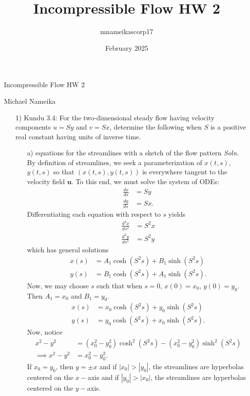 \documentclass{article}
\title{Incompressible Flow HW 2}
\author{mnameikascorp17 }
\date{February 2025}
\begin{document}
\begin{center}
    {\huge Incompressible Flow HW 2}
    \vspace{0.5cm}

    {\large Michael Nameika}
\end{center}

\begin{itemize}
    \item[1)] Kundu 3.4: For the two-dimensional steady flow having velocity components $u = Sy$ and $v = Sx$, determine the following when $S$ is a positive real constant having units of inverse time.
    \begin{itemize}
        \item[a)] equations for the streamlines with a sketch of the flow pattern
        \newline\newline
        \textit{Soln.} By definition of streamlines, we seek a parameterization of $x(t,s)$, $y(t,s)$ so that $(x(t,s),y(t,s))$ is everywhere tangent to the velocity field $\mathbf{u}$. To this end, we must solve the system of ODEs:
        \begin{align*}
            \frac{d x}{d s} &= Sy\\
            \frac{d y}{d s} &= Sx.
        \end{align*}
        Differentiating each equation with respect to $s$ yields
        \begin{align*}
            \frac{d^2x}{ds^2} &= S^2x\\
            \frac{d^2y}{d s^2} &= S^2y
        \end{align*}
        which has general solutions 
        \begin{align*}
            x(s) &= A_1\cosh(S^2s) + B_1\sinh(S^2s)\\
            y(s) &= B_1\cosh(S^2s) + A_1\sinh(S^2s).
        \end{align*}
        Now, we may choose $s$ such that when $s = 0$, $x(0) = x_0$, $y(0) = y_0$. Then $A_1 = x_0$ and $B_1 = y_0$.
        \begin{align*}
            x(s) &= x_0\cosh(S^2s) + y_0\sinh(S^2s)\\
            y(s) &= y_0\cosh(S^2s) + x_0\sinh(S^2s).
        \end{align*}
        Now, notice 
        \begin{align*}
            x^2 - y^2 &= (x_0^2 - y_0^2)\cosh^2(S^2s) - (x_0^2 - y_0^2)\sinh^2(S^2s)\\
            \implies x^2-y^2&= x_0^2 - y_0^2.
        \end{align*}
        If $x_0 = y_0$, then $y = \pm x$ and if $|x_0| > |y_0|$, the streamlines are hyperbolas centered on the $x-$axis and if $|y_0|>|x_0|$, the streamlines are hyperbolas centered on the $y-$axis.
        \pagebreak


\end{itemize}
\end{itemize}
\end{document}

